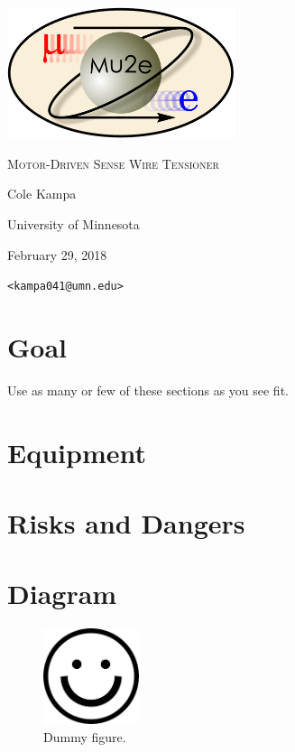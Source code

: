 \documentclass[letterpaper,12pt]{article}
\begin{document}
\begin{titlepage}
	\centering
	\includegraphics[width=0.5\textwidth]{mu2e_logo_oval.png}\par\vspace{2cm}
	{\scshape\LARGE Motor-Driven Sense Wire Tensioner\par}
	\vspace{3cm}
	{\Large Cole Kampa\par}
	\vspace{3cm}
	{\large University of Minnesota\par}
 	\vspace{.5cm}
	{\large February 29, 2018\par}
	\vfill
	{{\tt <kampa041@umn.edu>} \par}
\end{titlepage}

\clearpage
\setcounter{page}{2}


\section{Goal}
Use as many or few of these sections as you see fit.

\section{Equipment}


\section{Risks and Dangers}


\section{Diagram}
	\begin{figure} [h]
		\centering
		\includegraphics[width=0.25\textwidth]{dummy.png}
		\caption{Dummy figure.}
		\label{fig:dummy}
	\end{figure}
\end{document}
